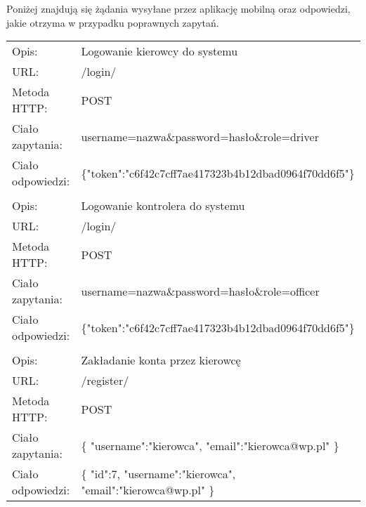 Poniżej znajdują się żądania wysyłane przez aplikację mobilną oraz odpowiedzi, jakie otrzyma w przypadku poprawnych zapytań.


\vspace{0.5cm}
\begin{longtable}{p{3.5cm}  p{11cm}}
	
	Opis:&Logowanie kierowcy do systemu\\
	URL:&/login/\\
	Metoda HTTP:&POST\\
	Ciało zapytania:&username=nazwa\&password=hasło\&role=driver\\
	Ciało odpowiedzi:&\{"token":"c6f42c7cff7ae417323b4b12dbad0964f70dd6f5"\}\\
	
	&\\
	
	Opis:&Logowanie kontrolera do systemu\\
	URL:&/login/\\
	Metoda HTTP:&POST\\
	Ciało zapytania:&username=nazwa\&password=hasło\&role=officer\\
	Ciało odpowiedzi:&\{"token":"c6f42c7cff7ae417323b4b12dbad0964f70dd6f5"\}\\
	
	&\\
	
	Opis:&Zakładanie konta przez kierowcę\\
	URL:&/register/\\
	Metoda HTTP:&POST\\
	Ciało zapytania:&\{\newline
	\-\hspace{1cm}"username":"kierowca",\newline
	\-\hspace{1cm}"email":"kierowca@wp.pl"\newline
	\}\\
	Ciało odpowiedzi:&\{\newline
	\-\hspace{1cm}"id":7,\newline
	\-\hspace{1cm}"username":"kierowca",\newline
	\-\hspace{1cm}"email":"kierowca@wp.pl"\newline
	\}\\
	

\end{longtable}
